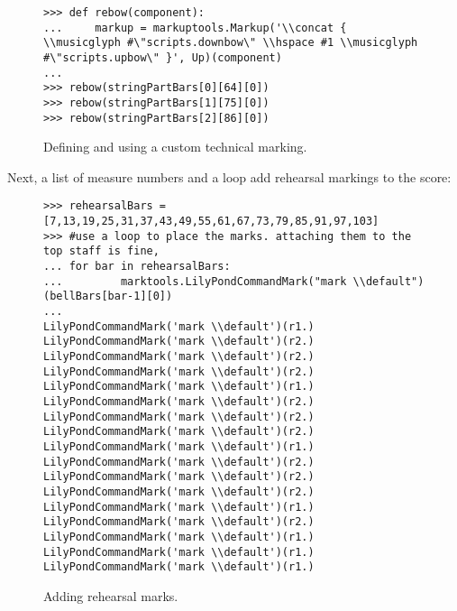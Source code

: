 \begin{figure}[H] 
\begin{lstlisting}[basicstyle=\scriptsize\ttfamily, breaklines=True, tabsize=4, showtabs=false, showspaces=false]
>>> def rebow(component):
...     markup = markuptools.Markup('\\concat { \\musicglyph #\"scripts.downbow\" \\hspace #1 \\musicglyph #\"scripts.upbow\" }', Up)(component)
... 
>>> rebow(stringPartBars[0][64][0])
>>> rebow(stringPartBars[1][75][0])
>>> rebow(stringPartBars[2][86][0])\end{lstlisting}

\caption{Defining and using a custom technical marking. } 
\end{figure}

Next, a list of measure numbers and a loop add rehearsal markings to the score:
\begin{figure}[H] 
\begin{lstlisting}[basicstyle=\scriptsize\ttfamily, breaklines=True, tabsize=4, showtabs=false, showspaces=false]
>>> rehearsalBars = [7,13,19,25,31,37,43,49,55,61,67,73,79,85,91,97,103]
>>> #use a loop to place the marks. attaching them to the top staff is fine,
... for bar in rehearsalBars:
... 		marktools.LilyPondCommandMark("mark \\default")(bellBars[bar-1][0])
... 
LilyPondCommandMark('mark \\default')(r1.)
LilyPondCommandMark('mark \\default')(r2.)
LilyPondCommandMark('mark \\default')(r2.)
LilyPondCommandMark('mark \\default')(r2.)
LilyPondCommandMark('mark \\default')(r1.)
LilyPondCommandMark('mark \\default')(r2.)
LilyPondCommandMark('mark \\default')(r2.)
LilyPondCommandMark('mark \\default')(r2.)
LilyPondCommandMark('mark \\default')(r1.)
LilyPondCommandMark('mark \\default')(r2.)
LilyPondCommandMark('mark \\default')(r2.)
LilyPondCommandMark('mark \\default')(r2.)
LilyPondCommandMark('mark \\default')(r1.)
LilyPondCommandMark('mark \\default')(r2.)
LilyPondCommandMark('mark \\default')(r1.)
LilyPondCommandMark('mark \\default')(r1.)
LilyPondCommandMark('mark \\default')(r1.)\end{lstlisting}

\caption{Adding rehearsal marks. } 
\end{figure}

